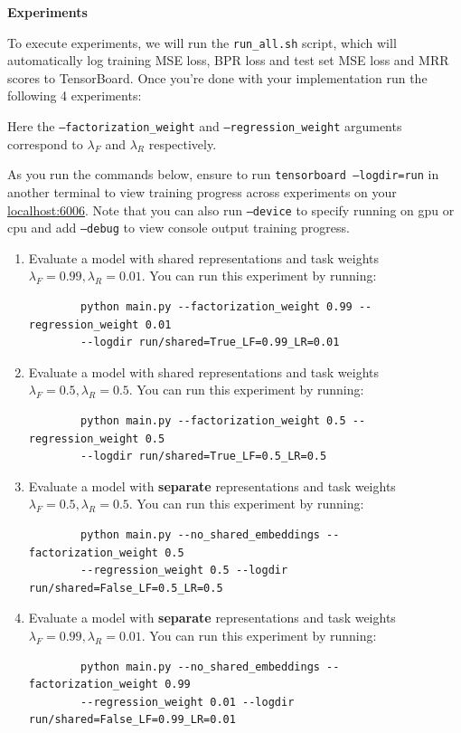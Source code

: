 \item {\bf Experiments}

To execute experiments, we will run the \texttt{run\_all.sh} script, which will automatically log training MSE loss, BPR loss and test set MSE loss and MRR scores to TensorBoard. Once you're done with your implementation run the following 4 experiments:

Here the \texttt{--factorization\_weight} and \texttt{--regression\_weight} arguments correspond to $\lambda_F$ and  $\lambda_R$ respectively.

As you run the commands below, ensure to run \texttt{tensorboard --logdir=run} in another terminal to view training progress across experiments on your \href{http://localhost:6006/}{localhost:6006}. Note that you can also run \texttt{--device} to specify running on gpu or cpu and add \texttt{--debug} to view console output training progress.

\begin{enumerate}[I]
    \item Evaluate a model with shared representations and task weights $\lambda_F=0.99, \lambda_R=0.01$. You can run this experiment by running:
    
    \begin{verbatim}
        python main.py --factorization_weight 0.99 --regression_weight 0.01 
        --logdir run/shared=True_LF=0.99_LR=0.01
    \end{verbatim}    
    
    \item Evaluate a model with shared representations and task weights $\lambda_F=0.5, \lambda_R=0.5$. You can run this experiment by running:    

    \begin{verbatim}
        python main.py --factorization_weight 0.5 --regression_weight 0.5
        --logdir run/shared=True_LF=0.5_LR=0.5
    \end{verbatim}
        
    \item Evaluate a model with \textbf{separate} representations and task weights $\lambda_F=0.5, \lambda_R=0.5$. You can run this experiment by running:    

    \begin{verbatim}
        python main.py --no_shared_embeddings --factorization_weight 0.5
        --regression_weight 0.5 --logdir run/shared=False_LF=0.5_LR=0.5
    \end{verbatim}
        
    \item Evaluate a model with \textbf{separate} representations and task weights $\lambda_F=0.99, \lambda_R=0.01$. You can run this experiment by running:    

    \begin{verbatim}
        python main.py --no_shared_embeddings --factorization_weight 0.99
        --regression_weight 0.01 --logdir run/shared=False_LF=0.99_LR=0.01
    \end{verbatim} 
        
\end{enumerate}

